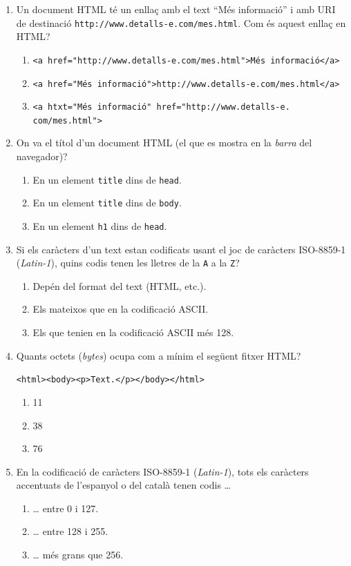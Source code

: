 \begin{enumerate}
\item Un document HTML té un enllaç amb el text ``Més informació'' i
  amb URI de destinació
  \verb|http://www.detalls-e.com/mes.html|. Com és aquest
  enllaç en HTML?
  \begin{enumerate}
  \item \verb|<a href="http://www.detalls-e.com/mes.html">Més informació</a>|
  \item \verb|<a href="Més informació">http://www.detalls-e.com/mes.html</a>|
  \item \verb|<a htxt="Més informació" href="http://www.detalls-e.|
    \verb|com/mes.html">|
  \end{enumerate}

\item On va el títol d'un document HTML (el que es mostra en la
  \emph{barra} del navegador)?
  \begin{enumerate}
  \item En un element \verb|title| dins de \verb|head|.
  \item En un element \verb|title| dins de \verb|body|.
  \item En un element \verb|h1| dins de \verb|head|.
  \end{enumerate}

\item Si els caràcters d'un text estan codificats usant el joc de
  caràcters ISO-8859-1 (\emph{Latin-1}), quins codis tenen les lletres
  de la \verb|A| a la \verb|Z|?
  \begin{enumerate}
  \item Depén del format del text (HTML, etc.).
  \item Els mateixos que en la codificació ASCII.
  \item Els que tenien en la codificació ASCII més 128.
  \end{enumerate}

\item Quants octets (\emph{bytes}) ocupa com a mínim el següent fitxer
  HTML?
  \begin{center}
    \verb|<html><body><p>Text.</p></body></html>|
  \end{center}
  \begin{enumerate}
  \item 11
  \item 38
  \item 76
  \end{enumerate}

\item En la codificació de caràcters ISO-8859-1 (\emph{Latin-1}), tots
  els caràcters accentuats de l'espanyol o del català tenen
  codis {\ldots}
  \begin{enumerate}
  \item {\ldots} entre 0 i 127.
  \item {\ldots} entre 128 i 255.
  \item {\ldots} més grans que 256.
  \end{enumerate}


\end{enumerate}
